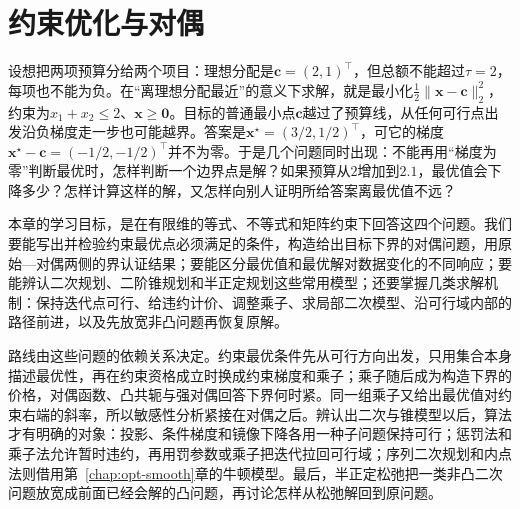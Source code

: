 \chapter{约束优化与对偶}
\label{chap:constrained-optimization}

设想把两项预算分给两个项目：理想分配是$\bm c=(2,1)^\top$，但总额不能超过$\tau=2$，每项也不能为负。在“离理想分配最近”的意义下求解，就是最小化$\frac12\lVert\bm x-\bm c\rVert_2^2$，约束为$x_1+x_2\leq2$、$\bm x\geq\bm0$。目标的普通最小点$\bm c$越过了预算线，从任何可行点出发沿负梯度走一步也可能越界。答案是$\bm x^\star=(3/2,1/2)^\top$，可它的梯度$\bm x^\star-\bm c=(-1/2,-1/2)^\top$并不为零。于是几个问题同时出现：不能再用“梯度为零”判断最优时，怎样判断一个边界点是解？如果预算从$2$增加到$2.1$，最优值会下降多少？怎样计算这样的解，又怎样向别人证明所给答案离最优值不远？

本章的学习目标，是在有限维的等式、不等式和矩阵约束下回答这四个问题。我们要能写出并检验约束最优点必须满足的条件，构造给出目标下界的对偶问题，用原始—对偶两侧的界认证结果；要能区分最优值和最优解对数据变化的不同响应；要能辨认二次规划、二阶锥规划和半正定规划这些常用模型；还要掌握几类求解机制：保持迭代点可行、给违约计价、调整乘子、求局部二次模型、沿可行域内部的路径前进，以及先放宽非凸问题再恢复原解。

路线由这些问题的依赖关系决定。约束最优条件先从可行方向出发，只用集合本身描述最优性，再在约束资格成立时换成约束梯度和乘子；乘子随后成为构造下界的价格，对偶函数、凸共轭与强对偶回答下界何时紧。同一组乘子又给出最优值对约束右端的斜率，所以敏感性分析紧接在对偶之后。辨认出二次与锥模型以后，算法才有明确的对象：投影、条件梯度和镜像下降各用一种子问题保持可行；惩罚法和乘子法允许暂时违约，再用罚参数或乘子把迭代拉回可行域；序列二次规划和内点法则借用第~\ref{chap:opt-smooth}章的牛顿模型。最后，半正定松弛把一类非凸二次问题放宽成前面已经会解的凸问题，再讨论怎样从松弛解回到原问题。












